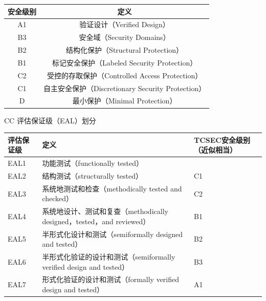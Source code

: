 \begin{table}[H]
    \vspace{-0.5em}
    \centering
    \begin{tabular}{|c|c|}
    \hline
    \textbf{安全级别} & \textbf{定义}                               \\ \hline
    A1            & 验证设计（Verified Design）                     \\ \hline
    B3            & 安全域（Security Domains）                     \\ \hline
    B2            & 结构化保护（Structural Protection）              \\ \hline
    B1            & 标记安全保护（Labeled Security Protection）       \\ \hline
    C2            & 受控的存取保护（Controlled Access Protection）     \\ \hline
    C1            & 自主安全保护（Discretionary Security Protection） \\ \hline
    D             & 最小保护（Minimal Protection）                  \\ \hline
    \end{tabular}
    \vspace{-1em}
\end{table}

CC 评估保证级（EAL）划分
\vspace{-0.5em}
\begin{longtable}{|W{c}{1.8cm}|m{8.5cm}<{\centering}|m{3cm}<{\centering}|}
    \hline
    \textbf{评估保证级} & \textbf{定义}                                            & \textbf{TCSEC安全级别（近似相当）} \\ \hline
    EAL1           & 功能测试（functionally tested）                              &                          \\ \hline
    EAL2           & 结构测试（structurally tested）                              & C1                       \\ \hline
    EAL3           & 系统地测试和检查（methodically tested and checked）              & C2                       \\ \hline
    EAL4           & 系统地设计、测试和复查（methodically designed，tested，and reviewed） & B1                       \\ \hline
    EAL5           & 半形式化设计和测试（semiformally designed and tested）            & B2                       \\ \hline
    EAL6           & 半形式化验证的设计和测试（semiformally verified design and tested）  & B3                       \\ \hline
    EAL7           & 形式化验证的设计和测试（formally verified design and tested）       & A1                       \\ \hline
\end{longtable}
\vspace{-1em}

